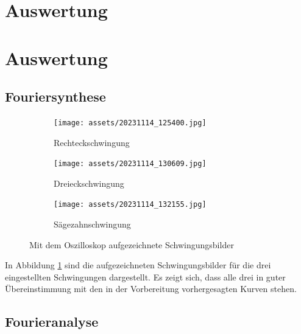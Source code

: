 \section{Auswertung}
\label{sec:Auswertung}

\section{Auswertung}
\subsection{Fouriersynthese}
\begin{figure}
    \begin{subfigure}{0.5\textwidth}
        \centering
        \texttt{[image: assets/20231114\_125400.jpg]}
        \caption{Rechteckschwingung}
    \end{subfigure}
    \begin{subfigure}{0.5\textwidth}
        \centering
        \texttt{[image: assets/20231114\_130609.jpg]}
        \caption{Dreieckschwingung}
    \end{subfigure}
    \begin{subfigure}{0.5\textwidth}
        \centering
        \texttt{[image: assets/20231114\_132155.jpg]}
        \caption{Sägezahnschwingung}
    \end{subfigure}
    \caption{Mit dem Oszilloskop aufgezeichnete Schwingungsbilder}
    \label{fig:oszi}
\end{figure}

In Abbildung \ref{fig:oszi} sind die aufgezeichneten Schwingungsbilder für die
drei eingestellten Schwingungen dargestellt. Es zeigt sich, dass alle drei in
guter Übereinstimmung mit den in der Vorbereitung vorhergesagten Kurven stehen.

\subsection{Fourieranalyse}
